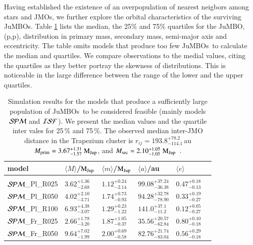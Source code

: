 \documentclass[submission,phys]{lib/SciPost}
\newcommand{\MJup}{\mbox{$\mathrm{{M}}_{\rm Jup}$}}
\newcommand{\jumbos}{\mbox{JuMBOs}}
\begin{document}
Having established the existence of an overpopulation of nearest
neigbors among stars and JMOs, we further explore the orbital
characteristics of the surviving \jumbos.  Table
\ref{Tab:orbital_distributions} lists the median, the 25\% and 75\%
quartiles for the JuMBO, (p,p), distribution in primary mass,
secondary mass, semi-major axis and eccentricity. The table omits
models that produce too few \jumbos\, to calculate the median and
quartiles. We compare observations to the medial values, citing the
quartiles as they better portray the skewness of distributions.  This
is noticeable in the large difference between the range of the lower
and the upper quartiles.


\begin{table}
  \caption{Simulation results for the models that produce a
    sufficiently large population of \jumbos\, to be considered
    feasible (mainly models ${\cal SPM}$ and ${\cal ISF}$). We present
    the median values and the quartile inter vales for 25\,\% and
    75\,\%.  The observed median inter-JMO distance in the Trapezium
    cluster is $r_{ij} = 193.8^{+78.2}_{-114.1}$\,au $M_{\rm prim} =
    3.67^{+1.31}_{-1.57}$\,\MJup, and $M_{\rm sec} =
    2.10^{+1.05}_{-1.05}$\,\MJup\, \cite{2023arXiv231001231P}.  }
\label{Tab:orbital_distributions}
 \centering 
 \begin{tabular}{llllll}
 \hline\hline
model&$\langle M \rangle$/\MJup & $\langle m \rangle$/\MJup & $\langle a \rangle$/au & $\langle e \rangle$ \\
 \hline \vspace{-0.75em} \\ 
 ${\cal SPM}$\_Pl\_R025 & $3.62^{+1.36}_{-2.68}$ & $1.12^{+0.24}_{-2.14}$ & $99.08^{+37.24}_{-36.38}$ & $0.47^{+0.18}_{-0.13}$ \vspace{0.25em}\\
 ${\cal SPM}$\_Pl\_R050 & $4.02^{+2.10}_{-3.71}$ & $1.74^{+0.73}_{-0.93}$ & $94.28^{+32.78}_{-78.90}$ & $0.33^{+0.19}_{-0.27}$ \vspace{0.25em}\\  
 ${\cal SPM}$\_Pl\_R100 & $6.93^{+4.38}_{-3.07}$ & $1.29^{+0.23}_{-1.22}$ & $141.0^{+37.1}_{-11.2}$ & $0.12^{+0.05}_{-0.27}$ \vspace{0.25em}\\
 ${\cal SPM}$\_Fr\_R025 & $2.66^{+1.78}_{-3.20}$ & $1.87^{+1.05}_{-0.37}$ & $35.56^{+20.57}_{-62.84}$ & $0.80^{+0.10}_{-0.18}$ \vspace{0.25em}\\ 
 ${\cal SPM}$\_Fr\_R050 & $9.64^{+7.02}_{-1.99}$ & $2.00^{+0.69}_{-0.58}$ & $82.76^{+21.74}_{-83.04}$ & $0.56^{+0.29}_{-0.18}$ \vspace{0.25em}\\ 

\end{tabular}
\end{table}
\end{document}
